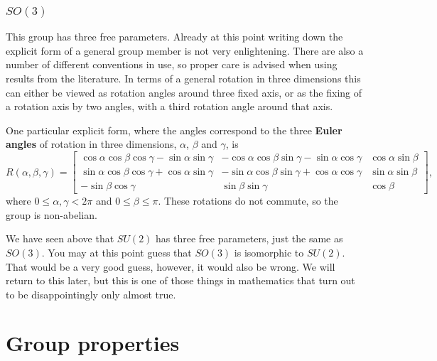 \documentclass[notes.tex]{subfiles}
\begin{document}
\subsubsection{$SO(3)$}
This group has three free parameters. Already at this point writing down the explicit form of a general group member is not very enlightening. There are also a number of different conventions in use, so proper care is advised when using results from the literature. In terms of a general rotation in three dimensions this can either be viewed as rotation angles around three fixed axis, or as the fixing of a rotation axis by two angles, with a third rotation angle around that axis. 

One particular explicit form, where the angles correspond to the three {\bf Euler angles} of rotation in three dimensions, $\alpha$, $\beta$ and $\gamma$, is
\[
R(\alpha,\beta,\gamma)=\left[\begin{matrix} 
\cos\alpha\cos\beta\cos\gamma-\sin\alpha\sin\gamma & -\cos\alpha\cos\beta\sin\gamma-\sin\alpha\cos\gamma & \cos\alpha\sin\beta  \\ 
\sin\alpha\cos\beta\cos\gamma+\cos\alpha\sin\gamma & -\sin\alpha\cos\beta\sin\gamma+\cos\alpha\cos\gamma & \sin\alpha\sin\beta  \\ 
-\sin\beta\cos\gamma & \sin\beta\sin\gamma  & \cos\beta 
\end{matrix}\right],
\]
where $0\le\alpha,\gamma< 2\pi$ and $0\le\beta\le\pi$. These rotations do not commute, so the group is non-abelian.

We have seen above that $SU(2)$ has three free parameters, just the same as $SO(3)$. You may at this point guess that $SO(3)$ is isomorphic to $SU(2)$. That would be a very good guess, however, it would also be wrong. We will return to this later, but this is one of those things in mathematics that turn out to be disappointingly only almost true.


\section{Group properties}
\label{sec:group_properties}

\end{document}
